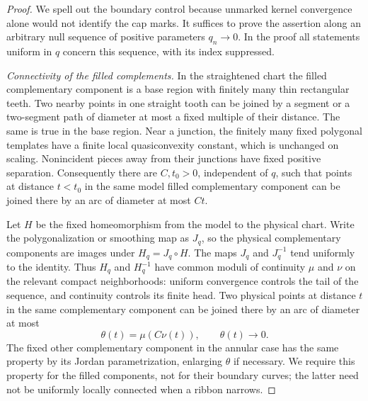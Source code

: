 \begin{proof}
We spell out the boundary control because unmarked kernel convergence
alone would not identify the cap marks.  It suffices to prove the
assertion along an arbitrary null sequence of positive parameters
$q_n\to0$.  In the proof all statements uniform in $q$ concern this
sequence, with its index suppressed.

\emph{Connectivity of the filled complements.}
In the straightened chart the filled complementary component is a
base region with finitely many thin rectangular teeth.  Two nearby
points in one straight tooth can be joined by a segment or a
two-segment path of diameter at most a fixed multiple of their
distance.  The same is true in the base region.  Near a junction,
the finitely many fixed polygonal templates have a finite local
quasiconvexity constant, which is unchanged on scaling.  Nonincident
pieces away from their junctions have fixed positive separation.
Consequently there are $C,t_0>0$, independent of $q$, such that points
at distance $t<t_0$ in the same model filled complementary component
can be joined there by an arc of diameter at most $Ct$.

Let $H$ be the fixed homeomorphism from the model to the physical
chart.  Write the polygonalization or smoothing map as $J_q$, so the
physical complementary components are images under $H_q=J_q\circ H$.
The maps $J_q$ and $J_q^{-1}$ tend uniformly to the identity.  Thus
$H_q$ and $H_q^{-1}$ have common moduli of continuity $\mu$ and $\nu$
on the relevant compact neighborhoods: uniform convergence controls
the tail of the sequence, and continuity controls its finite head.
Two physical points at distance
$t$ in the same complementary component can be joined there by an arc
of diameter at most
\begin{equation}\label{if:complement-modulus}
                 \theta(t)=\mu(C\nu(t)),\qquad \theta(t)\longrightarrow0.
\end{equation}
The fixed other complementary component in the annular case has the
same property by its Jordan parametrization, enlarging $\theta$ if
necessary.  We require this property for the filled components, not
for their boundary curves; the latter need not be uniformly locally
connected when a ribbon narrows.


\end{proof}

